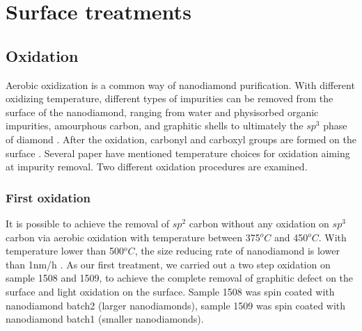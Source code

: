 
\chapter{Surface treatments} %

\label{Chapter2.5} %



\section{Oxidation}
Aerobic oxidization is a common way of nanodiamond purification. With different oxidizing temperature, different types of impurities can be removed from the surface of the nanodiamond, ranging from water and physisorbed organic impurities, amourphous carbon, and graphitic shells to ultimately the $sp^{3}$ phase of diamond \citep{t._gaebel_size-reduction_2012}. After the oxidation, carbonyl and carboxyl groups are formed on the surface \citep{wolcott_surface_2014}. Several paper have mentioned temperature choices for oxidation aiming at impurity removal.\citep{osswald_control_2006,wolcott_surface_2014,t._gaebel_size-reduction_2012} Two different oxidation procedures are examined.

\subsection[first Oxidation]{First oxidation}
It is possible to achieve the removal of $sp^{2}$ carbon without any oxidation on $sp^{3}$ carbon via aerobic oxidation with temperature between 375$^{o}C$ and 450$^{o}C$. \citep{osswald_control_2006} With temperature lower than 500$^{o}C$, the size reducing rate of nanodiamond is lower than 1nm/h \citep{t._gaebel_size-reduction_2012}. As our first treatment, we carried out a two step oxidation on sample 1508 and 1509, to achieve the complete removal of graphitic defect on the surface and light oxidation on the surface. Sample 1508 was spin coated with nanodiamond batch2 (larger nanodiamonds), sample 1509 was spin coated with nanodiamond batch1 (smaller nanodiamonds).

